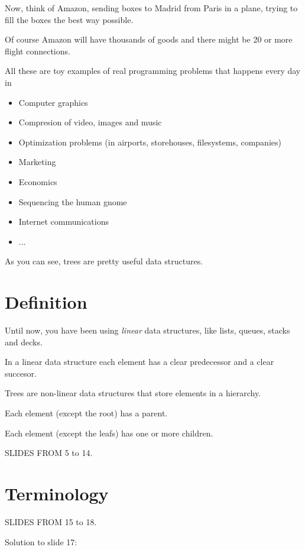 \documentclass[a4paper, 9pt]{extarticle}
\newcommand{\separator}{\begin{center}%
\noindent\makebox[\linewidth]{\rule{0.75\paperwidth}{0.4pt}}%
\end{center}}
\begin{document}
Now, think of Amazon, sending boxes to Madrid from Paris in a plane, trying to
fill the boxes the best way possible.

Of course Amazon will have thousands of goods and there might be 20 or more flight connections.


\separator

All these are toy examples of real programming problems that happens every day in

\begin{itemize}
  \item Computer graphics
  \item Compresion of video, images and music
  \item Optimization problems (in airports, storehouses, filesystems, companies)
  \item Marketing
  \item Economics
  \item Sequencing the human gnome
  \item Internet communications
  \item ...
\end{itemize}

As you can see, trees are pretty useful data structures.


\newpage

\section{Definition}

Until now, you have been using \emph{linear} data structures, like lists, queues, stacks and decks.

In a linear data structure each element has a clear predecessor and a clear succesor.

Trees are non-linear data structures that store elements in a hierarchy.

Each element (except the root) has a parent.

Each element (except the leafs) has one or more children.

SLIDES FROM 5 to 14.



\section{Terminology}

SLIDES FROM 15 to 18.

Solution to slide 17:
\end{document}
